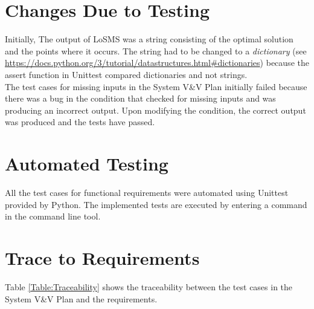 \documentclass[12pt, titlepage]{article}
\newcommand{\famname}{LoSMS}
\begin{document}
\section{Changes Due to Testing}  \label{ChangesDueToTesting}

Initially, The output of \famname{} was a string consisting of the optimal 
solution and the points where it occurs. The string had to be changed to a 
\textit{dictionary} (see 
\url{https://docs.python.org/3/tutorial/datastructures.html#dictionaries}) 
because the assert function in Unittest compared dictionaries and not strings. 
\\

The test cases for missing inputs in the System V\&V Plan initially failed 
because there was a bug in the condition that checked for missing inputs and 
was producing an incorrect output. Upon modifying the condition, the correct 
output was produced and the tests have passed.

\section{Automated Testing} \label{AutomatedTesting}

All the test cases for functional requirements were automated using Unittest 
provided by Python. The implemented tests are executed by entering a command in 
the command line tool.
		
\section{Trace to Requirements} \label{ReqTrace}

Table \ref{Table:Traceability} shows the traceability between the test cases in 
the System V\&V Plan and the requirements.
\end{document}
